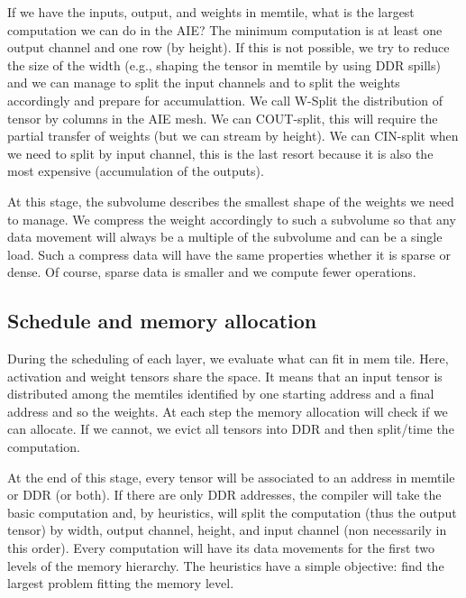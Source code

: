 \documentclass[sigconf]{acmart}
\begin{document}
If we have the inputs, output, and weights in memtile, what is the
largest computation we can do in the AIE? The minimum computation is
at least one output channel and one row (by height). If this is not
possible, we try to reduce the size of the width (e.g., shaping the
tensor in memtile by using DDR spills) and we can manage to split the
input channels and to split the weights accordingly and prepare for
accumulattion. We call W-Split the distribution of tensor by columns
in the AIE mesh. We can COUT-split, this will require the partial
transfer of weights (but we can stream by height).  We can CIN-split
when we need to split by input channel, this is the last resort
because it is also the most expensive (accumulation of the
outputs).

At this stage, the subvolume describes the smallest shape of the
weights we need to manage. We compress the weight accordingly to such
a subvolume so that any data movement will always be a multiple of the
subvolume and can be a single load. Such a compress data will have the
same properties whether it is sparse or dense. Of course, sparse data is
smaller and we compute fewer operations.


\subsection{Schedule and memory allocation}
During the scheduling of each layer, we evaluate what can fit in mem
tile. Here, activation and weight tensors share the space. It means
that an input tensor is distributed among the memtiles identified by
one starting address and a final address and so the weights. At each
step the memory allocation will check if we can allocate. If we
cannot, we evict all tensors into DDR and then split/time the
computation. 

At the end of this stage, every tensor will be associated to an
address in memtile or DDR (or both). If there are only DDR addresses,
the compiler will take the basic computation and, by heuristics, will
split the computation (thus the output tensor) by width, output
channel, height, and input channel (non necessarily in this
order). Every computation will have its data movements for the first
two levels of the memory hierarchy. The heuristics have a simple
objective: find the largest problem fitting the memory level.
\end{document}
